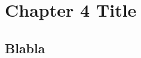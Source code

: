 
\chapter{Chapter 4 Title}
\label{chapter:4}
\minitoc
\newpage
\graphicspath{{2-Chapters/4-Chapter/Images/}}

\section{Blabla}
\label{sec:blabla}

